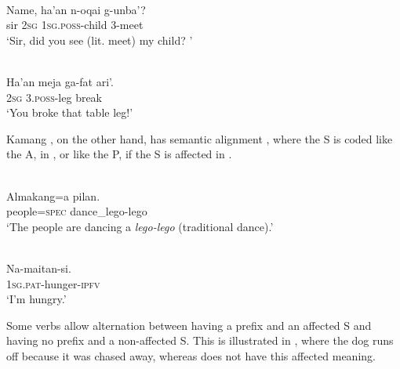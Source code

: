 \ea%
\label{bkm:Ref306280773}
 \\
\gll      Name,  ha'an  n-oqai  g-unba'?\\  
  sir  2\textsc{sg} 1\textsc{sg}.\textsc{poss}{}-child  3-meet   \\
\glt `Sir, did you see (lit. meet) my child? '
\z

 

 

 


\ea%
\label{bkm:Ref306280777}
 \\
\gll    Ha'an  meja  ga-fat  ari'.\\  
    2\textsc{sg}  
    3.\textsc{poss}{}-leg  break  \\
\glt  `You broke that table leg!' 
\z







Kamang , on the other hand, has semantic alignment , where the S is coded like the A,  in , or like the P, if the S is affected in . 


\ea 
\label{ex:1235}
 \\
 \gll      Almakang=a   pilan.    \\
    people=\textsc{spec} dance\_lego-lego    \\
 \glt  `The people are dancing a \textit{lego-lego} (traditional dance).'
\z

 

 




\ea%
\label{bkm:Ref353455458}
 \\
\gll     Na-maitan-si. \\  
    \textsc{1sg.pat-}hunger-\textsc{ipfv}  \\
\glt  `I'm hungry.'
\z

 





Some verbs allow alternation between having a prefix and an affected S and having no prefix and a non-affected S. This is illustrated in , where the dog runs off because it was chased away, whereas  does not have this affected  meaning.


